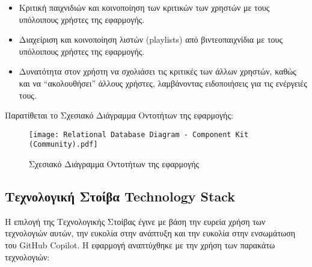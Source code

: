 \begin{itemize}
  \item
    Κριτική παιχνιδιών και κοινοποίηση των κριτικών των χρηστών με τους
    υπόλοιπους χρήστες της εφαρμογής.
  \item
    Διαχείριση και κοινοποίηση λιστών \textlatin{(playlists)} από
    βιντεοπαιχνίδια με τους υπόλοιπους χρήστες της εφαρμογής.
  \item
    Δυνατότητα στον χρήστη να σχολιάσει τις κριτικές των άλλων χρηστών,
    καθώς και να ``ακολουθήσει'' άλλους χρήστες, λαμβάνοντας ειδοποιήσεις
    για τις ενέργειές τους.
\end{itemize}

Παρατίθεται το Σχεσιακό Διάγραμμα Οντοτήτων της εφαρμογής:

\begin{figure}[htbp]
  \centering
  \texttt{[image: Relational Database Diagram -
  Component Kit (Community).pdf]}
  \caption{Σχεσιακό Διάγραμμα Οντοτήτων της εφαρμογής}
  \label{fig:rdd}
\end{figure}

\subsection{Τεχνολογική Στοίβα \textlatin{Technology Stack}}

Η επιλογή της Τεχνολογικής Στοίβας έγινε με βάση την ευρεία χρήση των
τεχνολογιών αυτών, την ευκολία στην ανάπτυξη και την ευκολία στην
ενσωμάτωση του \textlatin{GitHub Copilot}. Η εφαρμογή αναπτύχθηκε με την
χρήση των παρακάτω τεχνολογιών:

